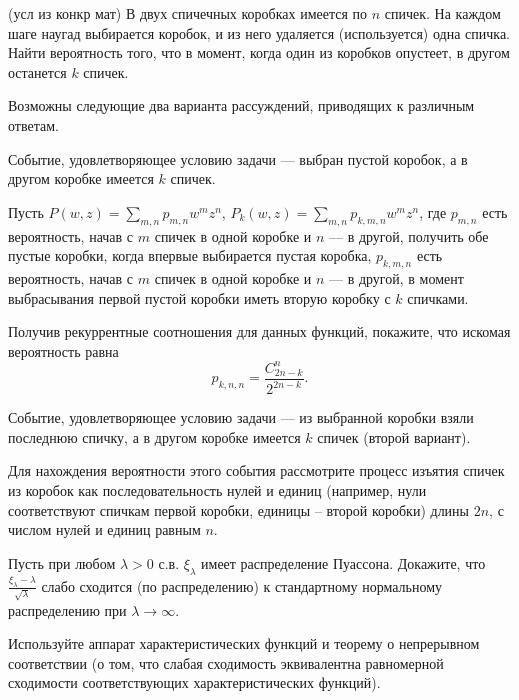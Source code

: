 \begin{problem}(усл из конкр мат)
В двух спичечных коробках имеется по $n$ спичек. На каждом шаге наугад выбирается коробок, и из него удаляется (используется) 
одна спичка. Найти вероятность того, что в момент, когда один из коробков опустеет, в другом останется $k$ спичек. 
\end{problem}

\begin{ordre}

Возможны следующие два варианта рассуждений, приводящих к различным ответам.

Событие, удовлетворяющее условию задачи --- выбран пустой коробок, а в другом коробке имеется $k$ спичек. 


Пусть $P(w,z)=\sum\limits_{m,n} p_{m,n} w^m z^n$, 
$P_k(w,z)=\sum\limits_{m,n} p_{k,m,n} w^m z^n$,
где $p_{m,n}$ есть вероятность, начав с $m$ спичек в одной коробке и $n$ --- в другой, получить обе пустые коробки, 
когда впервые выбирается пустая коробка, 
$p_{k,m,n}$ есть вероятность, начав с $m$ спичек в одной коробке и $n$ --- в другой, в момент выбрасывания  первой пустой коробки иметь вторую коробку с $k$ спичками. 

Получив рекуррентные соотношения для данных функций, покажите, что искомая вероятность равна 
$$
p_{k,n,n}=\frac{C_{2n-k}^n}{2^{2n-k}} . 
$$


Событие, удовлетворяющее условию задачи --- из выбранной коробки взяли последнюю спичку, а в другом коробке имеется $k$ спичек (второй вариант). 

Для нахождения вероятности этого события рассмотрите процесс изъятия спичек из коробок как последовательность нулей и единиц (например, нули соответствуют спичкам первой коробки, 
единицы -- второй коробки) длины $2n$, с числом нулей и единиц равным $n$. 
\end{ordre}

\begin{problem}
Пусть при любом $\lambda >0$ с.в. $\xi _{\lambda } $ имеет распределение Пуассона. Докажите, что $\frac{\xi _{\lambda } -\lambda }{\sqrt{\lambda } } $ слабо сходится (по распределению) к стандартному нормальному распределению при $\lambda \to \infty $.

\begin{ordre}
 Используйте аппарат характеристических функций и теорему о непрерывном соответствии (о том, что слабая сходимость эквивалентна равномерной сходимости соответствующих характеристических функций).
 \end{ordre}
\end{problem}

